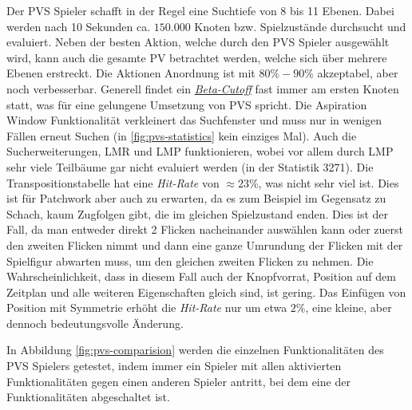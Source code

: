 Der \ac{PVS} Spieler schafft in der Regel eine Suchtiefe von 8 bis 11 Ebenen. Dabei werden nach 10 Sekunden ca. $150{.}000$ Knoten bzw. Spielzustände durchsucht und evaluiert. Neben der besten Aktion, welche durch den \ac{PVS} Spieler ausgewählt wird, kann auch die gesamte \acs{PV} betrachtet werden, welche sich über mehrere Ebenen erstreckt. Die Aktionen Anordnung ist mit $80\%-90\%$ akzeptabel, aber noch verbesserbar. Generell findet ein \hyperref[text:beta-cutoff]{\emph{Beta-Cutoff}} fast immer am ersten Knoten statt, was für eine gelungene Umsetzung von \ac{PVS} spricht. Die Aspiration Window Funktionalität verkleinert das Suchfenster und muss nur in wenigen Fällen erneut Suchen (in \ref{fig:pvs-statistics} kein einziges Mal). Auch die Sucherweiterungen, \ac{LMR} und \ac{LMP} funktionieren, wobei vor allem durch \ac{LMP} sehr viele Teilbäume gar nicht evaluiert werden (in der Statistik 3271). Die Transpositionstabelle hat eine \emph{Hit-Rate} von $\approx 23\%$, was nicht sehr viel ist. Dies ist für Patchwork aber auch zu erwarten, da es zum Beispiel im Gegensatz zu Schach, kaum Zugfolgen gibt, die im gleichen Spielzustand enden. Dies ist der Fall, da man entweder direkt 2 Flicken nacheinander auswählen kann oder zuerst den zweiten Flicken nimmt und dann eine ganze Umrundung der Flicken mit der Spielfigur abwarten muss, um den gleichen zweiten Flicken zu nehmen. Die Wahrscheinlichkeit, dass in diesem Fall auch der Knopfvorrat, Position auf dem Zeitplan und alle weiteren Eigenschaften gleich sind, ist gering. Das Einfügen von Position mit Symmetrie erhöht die \emph{Hit-Rate} nur um etwa $2\%$, eine kleine, aber dennoch bedeutungsvolle Änderung.

In Abbildung \ref{fig:pvs-comparision} werden die einzelnen Funktionalitäten des \ac{PVS} Spielers getestet, indem immer ein Spieler mit allen aktivierten Funktionalitäten gegen einen anderen Spieler antritt, bei dem eine der Funktionalitäten abgeschaltet ist.

